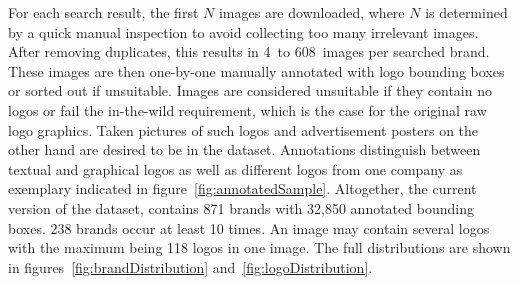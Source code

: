 \documentclass[a4paper,twoside]{article}
\begin{document}
For each search result, the first $N$ images are downloaded, where $N$ is determined by a quick manual inspection to avoid collecting too many irrelevant images. 
After removing duplicates, this results in 4~to 608~images per searched brand. These images are then one-by-one manually annotated with logo bounding boxes or sorted out if unsuitable.
Images are considered unsuitable if they contain no logos or fail the in-the-wild requirement, which is the case for the original raw logo graphics. Taken pictures of such logos and advertisement posters on the other hand are desired to be in the dataset. 
Annotations distinguish between textual and graphical logos as well as different logos from one company as exemplary indicated in figure~\ref{fig:annotatedSample}.
Altogether, the current version of the dataset, contains 871 brands with 32,850 annotated bounding boxes. 238 brands occur at least 10 times. An image may contain several logos with the maximum being 118 logos in one image. The full distributions are shown in figures~\ref{fig:brandDistribution} and~\ref{fig:logoDistribution}. 
\end{document}
